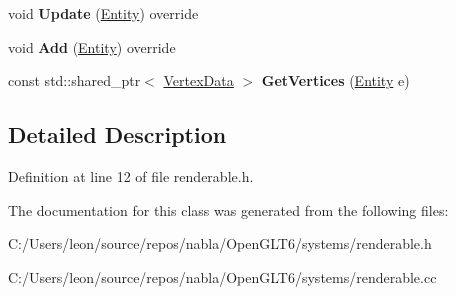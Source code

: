 \begin{DoxyCompactItemize}
\item 
\mbox{\label{classnabla_1_1_renderable_system_a691db51d9b2ce6aa5cc161e7db6a07be}} 
void {\bfseries Update} (\mbox{\hyperlink{structnabla_1_1_entity}{Entity}}) override
\item 
\mbox{\label{classnabla_1_1_renderable_system_afe2fd5bbb91291d695ca010839b8ee1b}} 
void {\bfseries Add} (\mbox{\hyperlink{structnabla_1_1_entity}{Entity}}) override
\item 
\mbox{\label{classnabla_1_1_renderable_system_a3163efaa7a64fcaba60b3fe6dd7dd9c1}} 
const std\+::shared\+\_\+ptr$<$ \mbox{\hyperlink{structnabla_1_1_renderable_system_1_1_vertex_data}{Vertex\+Data}} $>$ {\bfseries Get\+Vertices} (\mbox{\hyperlink{structnabla_1_1_entity}{Entity}} e)
\end{DoxyCompactItemize}


\subsection{Detailed Description}


Definition at line 12 of file renderable.\+h.



The documentation for this class was generated from the following files\+:\begin{DoxyCompactItemize}
\item 
C\+:/\+Users/leon/source/repos/nabla/\+Open\+G\+L\+T6/systems/renderable.\+h\item 
C\+:/\+Users/leon/source/repos/nabla/\+Open\+G\+L\+T6/systems/renderable.\+cc\end{DoxyCompactItemize}
